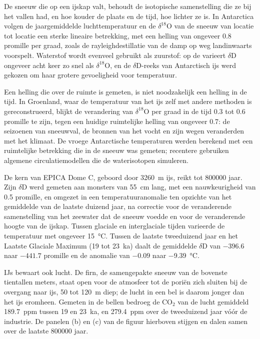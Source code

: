 De sneeuw die op een ijskap valt, behoudt de isotopische samenstelling die ze bij het vallen had, en hoe
kouder de plaats en de tijd, hoe lichter ze is. In Antarctica volgen de jaargemiddelde luchttemperatuur en
de $\delta^{18}$O van de sneeuw van locatie tot locatie een sterke lineaire betrekking, met een
helling van ongeveer \num{0.8} promille per graad, zoals de rayleighdestillatie van de damp op weg
landinwaarts voorspelt. Waterstof wordt evenveel gebruikt als zuurstof: op de  varieert $\delta$D ongeveer acht keer zo snel als $\delta^{18}$O, en
de $\delta$D-reeks van Antarctisch ijs werd gekozen om haar grotere gevoeligheid voor temperatuur.

Een helling die over de ruimte is gemeten, is niet noodzakelijk een helling in de tijd. In Groenland, waar de temperatuur
van het ijs zelf met andere methoden is gereconstrueerd, blijkt de verandering van $\delta^{18}$O per graad
in de tijd 0.3 tot \num{0.6} promille te zijn, tegen een huidige ruimtelijke helling van ongeveer
\num{0.7}: de seizoenen van sneeuwval, de bronnen van het vocht en zijn wegen veranderden met het
klimaat. De vroege Antarctische temperaturen werden berekend met een ruimtelijke betrekking die in
de sneeuw was gemeten; recentere gebruiken algemene circulatiemodellen die de waterisotopen simuleren.

De kern van EPICA Dome C, geboord door \qty{3260}{m} ijs, reikt tot \num{800000} jaar. Zijn
$\delta$D werd gemeten aan monsters van \qty{55}{cm} lang, met een nauwkeurigheid van \num{0.5} promille, en
omgezet in een temperatuuranomalie ten opzichte van het gemiddelde van de laatste duizend jaar, na
correctie voor de veranderende samenstelling van het zeewater dat de sneeuw voedde en voor de veranderende
hoogte van de ijskap. Tussen glaciale en interglaciale tijden varieerde de temperatuur met ongeveer
\qty{15}{\celsius}. Tussen de laatste tweeduizend jaar en het Laatste Glaciale Maximum (\num{19} tot
\qty{23}{ka}) daalt de gemiddelde $\delta$D van $-396.6$ naar $-441.7$ promille en de anomalie van
$-0.09$ naar \qty{-9.39}{\celsius}.

IJs bewaart ook lucht. De firn, de samengepakte sneeuw van de bovenste tientallen meters, staat open voor de
atmosfeer tot de poriën zich sluiten bij de overgang naar ijs, 50 tot \qty{120}{m} diep; de lucht
in een bel is daarom jonger dan het ijs eromheen. Gemeten in de bellen bedroeg de CO$_2$ van de
lucht gemiddeld \qty{189.7}{ppm} tussen \num{19} en \qty{23}{ka}, en \qty{279.4}{ppm} over
de tweeduizend jaar vóór de industrie. De panelen (b) en (c) van de figuur hierboven stijgen en dalen
samen over de laatste \num{800000} jaar.


